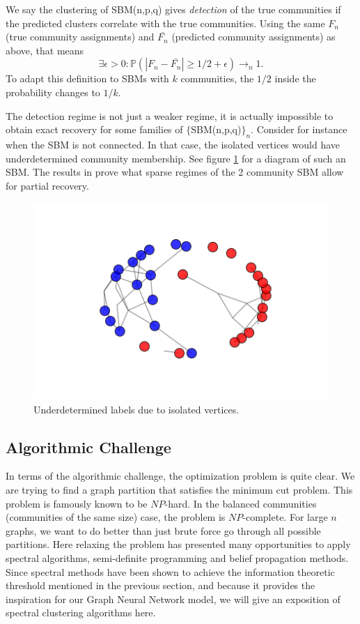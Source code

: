 \begin{definition}
We say the clustering of SBM(n,p,q) gives \textit{detection} of the true communities if the predicted clusters correlate with the true communities.  Using the same $F_n$ (true community assignments) and $\bar{F_n}$ (predicted community assignments) as above, that means $$\exists \epsilon > 0 : \mathbb{P}(|F_n-\bar{F_n}| \geq 1/2+\epsilon) \rightarrow_n 1.$$ To adapt this definition to SBMs with $k$ communities, the $1/2$ inside the probability changes to $1/k$.  
\end{definition}

The detection regime is not just a weaker regime, it is actually impossible to obtain exact recovery for some families of $\{$SBM(n,p,q)$\}_n$.  Consider for instance when the SBM is not connected. In that case, the isolated vertices would have underdetermined community membership.  See figure \ref{fig:sparse} for a diagram of such an SBM. The results in \cite{MNS} prove what sparse regimes of the 2 community SBM allow for partial recovery.  


\begin{figure}[h]
\begin{center}
  \includegraphics[scale=0.5]{SBM_balanced_large_sparse.png}
  \caption{Underdetermined labels due to isolated vertices.}
  \label{fig:sparse}
 \end{center}
\end{figure}

\subsection{Algorithmic Challenge}

In terms of the algorithmic challenge, the optimization problem is quite clear.  We are trying to find a graph partition that satisfies the minimum cut problem.  This problem is famously known to be $NP$-hard. In the balanced communities (communities of the same size) case, the problem is $NP$-complete.  For large $n$ graphs, we want to do better than just brute force go through all possible partitions.  Here relaxing the problem has presented many opportunities to apply spectral algorithms, semi-definite programming and belief propagation methods.  Since spectral methods have been shown to achieve the information theoretic threshold mentioned in the previous section, and because it provides the inspiration for our Graph Neural Network model, we will give an exposition of spectral clustering algorithms here.  


